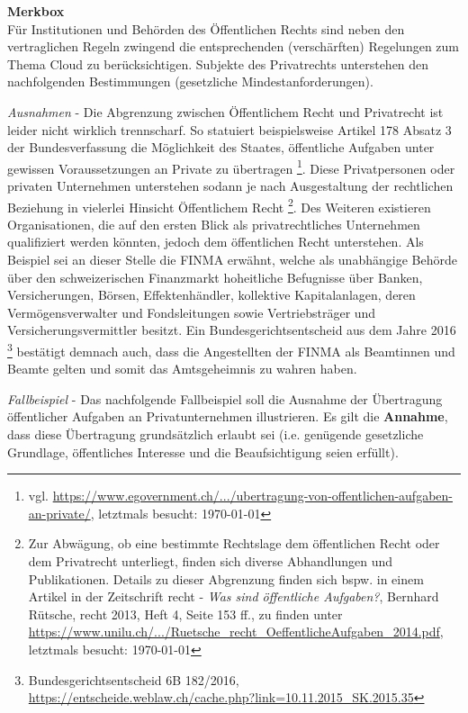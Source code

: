 \documentclass[a4paper,pointlessnumbers]{scrreprt}
\newcommand{\merkbox}[2][0.8\textwidth]{ \begin{center} \begin{tcolorbox}[enhanced, drop fuzzy midday shadow, width={#1}, opacityframe=0.5, colframe=BrickRed, colback=white] {\ECFTeenSpirit \color{BrickRed}\textbf{Merkbox} \qquad {\tiny das gilt es zu beachten}} \\  #2 \end{tcolorbox} \end{center}}
\begin{document}
\merkbox[0.7\textwidth]{Für Institutionen und Behörden des Öffentlichen Rechts sind neben den vertraglichen Regeln zwingend die entsprechenden (verschärften) Regelungen zum Thema Cloud zu berücksichtigen. Subjekte des Privatrechts unterstehen den nachfolgenden Bestimmungen (gesetzliche Mindestanforderungen).}

\textit{Ausnahmen} - Die Abgrenzung zwischen Öffentlichem Recht und Privatrecht ist leider nicht wirklich trennscharf. So statuiert beispielsweise Artikel 178 Absatz 3 der Bundesverfassung die Möglichkeit des Staates, öffentliche Aufgaben unter gewissen Voraussetzungen an Private zu übertragen \footnote{vgl. \href{https://www.egovernment.ch/de/dokumentation/rechtliche-fragen/zusammenarbeit/ubertragung-von-offentlichen-aufgaben-an-private/}{https://www.egovernment.ch/.../ubertragung-von-offentlichen-aufgaben-an-private/}, letztmals besucht: \today}. Diese Privatpersonen oder privaten Unternehmen unterstehen sodann je nach Ausgestaltung der rechtlichen Beziehung in vielerlei Hinsicht Öffentlichem Recht \footnote{Zur Abwägung, ob eine bestimmte Rechtslage dem öffentlichen Recht oder dem Privatrecht unterliegt, finden sich diverse Abhandlungen und Publikationen. Details zu dieser Abgrenzung finden sich bspw. in einem Artikel in der Zeitschrift recht - \textit{Was sind öffentliche Aufgaben?}, Bernhard Rütsche, recht 2013, Heft 4, Seite 153 ff., zu finden unter\\ \href{https://www.unilu.ch/fileadmin/fakultaeten/rf/ruetsche/dok/Ruetsche\_recht\_OeffentlicheAufgaben\_2014.pdf}{https://www.unilu.ch/.../Ruetsche\_recht\_OeffentlicheAufgaben\_2014.pdf}, letztmals besucht: \today}. Des Weiteren existieren Organisationen, die auf den ersten Blick als privatrechtliches Unternehmen qualifiziert werden könnten, jedoch dem öffentlichen Recht unterstehen. Als Beispiel sei an dieser Stelle die FINMA erwähnt, welche als unabhängige Behörde über den schweizerischen Finanzmarkt hoheitliche Befugnisse über Banken, Versicherungen, Börsen, Effektenhändler, kollektive Kapitalanlagen, deren Vermögensverwalter und Fondsleitungen sowie Vertriebsträger und Versicherungsvermittler besitzt. Ein Bundesgerichtsentscheid aus dem Jahre 2016 \footnote{Bundesgerichtsentscheid 6B 182/2016, \href{https://entscheide.weblaw.ch/cache.php?link=10.11.2015\_SK.2015.35}{https://entscheide.weblaw.ch/cache.php?link=10.11.2015\_SK.2015.35}} bestätigt demnach auch, dass die Angestellten der FINMA als Beamtinnen und Beamte gelten und somit das Amtsgeheimnis zu wahren haben.

\textit{Fallbeispiel} - Das nachfolgende Fallbeispiel soll die Ausnahme der Übertragung öffentlicher Aufgaben an Privatunternehmen illustrieren. Es gilt die \textbf{Annahme}, dass diese Übertragung grundsätzlich erlaubt sei (i.e. genügende gesetzliche Grundlage, öffentliches Interesse und die Beaufsichtigung seien erfüllt).
\end{document}
